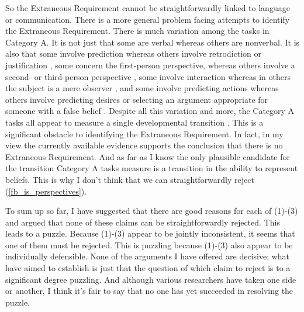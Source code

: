 \documentclass[12pt,\papersize]{extarticle}
\begin{document}
So the Extraneous Requirement cannot be straightforwardly linked to language or communication.
There is a more general problem facing attempts to identify the Extraneous Requirement.
There is much variation among the tasks in Category A.
It is not just that some are verbal whereas others are nonverbal.
It is also that some involve prediction whereas others involve retrodiction or justification \citep[e.g.][]{Wimmer:1998kx},
some concern the first-person perspective, whereas others involve a second- or third-person perspective \citep[e.g.][]{Gopnik:1991db},
some involve interaction whereas in others the subject is a mere observer \citep[e.g.][]{Chandler:1989qa},
and some involve predicting actions whereas others involve predicting desires \citep{Astington:1991kk} or selecting an argument appropriate for someone with a false belief \citep{Bartsch:2000es}.
Despite all this variation and more, the Category A tasks all appear to measure a single developmental transition \citep{Wellman:2001lz}.
This is a significant obstacle to identifying the Extraneous Requirement.
In fact, in my view the currently available evidence supports the conclusion that there is no Extraneous Requirement.
And as far as I know the only plausible candidate for the transition  Category A tasks measure is a transition in the ability to represent beliefs.
This is why I don't think that we can straightforwardly reject  (\ref{fb_is_perspectives}).

To sum up so far, 
I have suggested that there are good reasons for each of (1)-(3) and 
argued that none of these claims can be straightforwardly rejected.
This leads to a puzzle.
Because (1)-(3) appear to be jointly inconsistent, it seems that one of them must be rejected.
This is puzzling because (1)-(3) also appear to be individually defensible.
None of the arguments I have offered are decisive; what have aimed to establish is just that the question of which claim to reject is to a significant degree puzzling.
And although various researchers have taken one side or another,
I think it's fair to say that no one has yet succeeded in resolving the puzzle.
\end{document}
